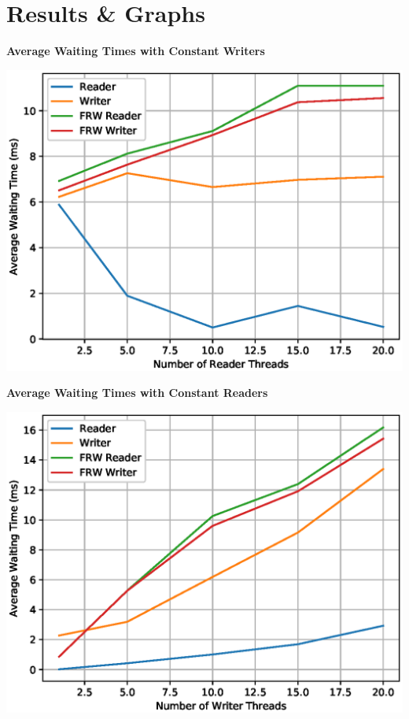 \documentclass[a4paper,12pt]{report}
\begin{document}
\newpage
\section{Results \& Graphs}
\begin{center}
\begin{large}
\textbf{Average Waiting Times with Constant Writers}\\
\end{large}
\includegraphics[scale=0.7]{./ConstantWriters-WaitingTimes.eps}
\end{center}
\begin{center}
\begin{large}
\textbf{Average Waiting Times with Constant Readers}\\
\end{large}
\includegraphics[scale=0.7]{./ConstantReaders-WaitingTimes.eps}
\end{center}
\end{document}
